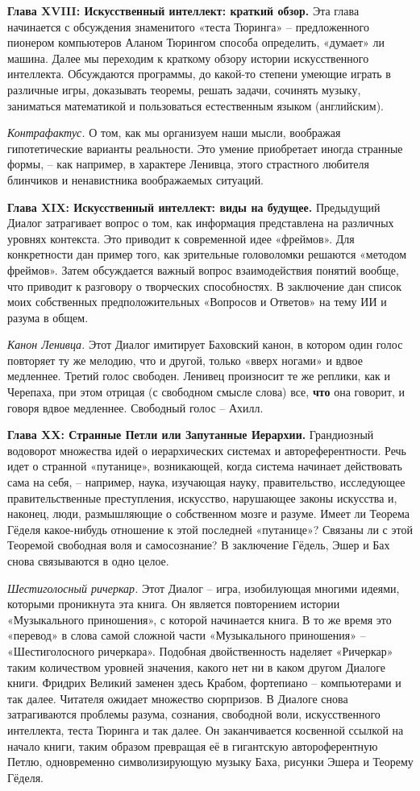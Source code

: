 \documentclass[../main.tex]{subfiles}
\begin{document}
\textbf{Глава XVIII: Искусственный интеллект: краткий обзор.}
Эта глава начинается с обсуждения знаменитого «теста Тюринга» \--- предложенного пионером компьютеров Аланом Тюрингом способа определить, «думает» ли машина. Далее мы переходим к краткому обзору истории искусственного интеллекта. Обсуждаются программы, до какой-то степени умеющие играть в различные игры, доказывать теоремы, решать задачи, сочинять музыку, заниматься математикой и пользоваться естественным языком (английским).

\emph{Контрафактус.}
О том, как мы организуем наши мысли, воображая гипотетические варианты реальности. Это умение приобретает иногда странные формы, \--- как например, в характере Ленивца, этого страстного любителя блинчиков и ненавистника воображаемых ситуаций.

\textbf{Глава XIX: Искусственный интеллект: виды на будущее.}
Предыдущий Диалог затрагивает вопрос о том, как информация представлена на различных уровнях контекста. Это приводит к современной идее «фреймов». Для конкретности дан пример того, как зрительные головоломки решаются «методом фреймов». Затем обсуждается важный вопрос взаимодействия понятий вообще, что приводит к разговору о творческих способностях. В заключение дан список моих собственных предположительных «Вопросов и Ответов» на тему ИИ и разума в общем.

\emph{Канон Ленивца.}
Этот Диалог имитирует Баховский канон, в котором один голос повторяет ту же мелодию, что и другой, только «вверх ногами» и вдвое медленнее. Третий голос свободен. Ленивец произносит те же реплики, как и Черепаха, при этом отрицая (с свободном смысле слова) все, \textbf{что} она говорит, и говоря вдвое медленнее. Свободный голос \--- Ахилл.

\textbf{Глава XX: Странные Петли или Запутанные Иерархии.}
Грандиозный водоворот множества идей о иерархических системах и автореферентности. Речь идет о странной «путанице», возникающей, когда система начинает действовать сама на себя, \--- например, наука, изучающая науку, правительство, исследующее правительственные преступления, искусство, нарушающее законы искусства и, наконец, люди, размышляющие о собственном мозге и разуме. Имеет ли Теорема Гёделя какое-нибудь отношение к этой последней «путанице»? Связаны ли с этой Теоремой свободная воля и самосознание? В заключение Гёдель, Эшер и Бах снова связываются в одно целое.

\emph{Шестиголосный ричеркар.}
Этот Диалог \--- игра, изобилующая многими идеями, которыми проникнута эта книга. Он является повторением истории «Музыкального приношения», с которой начинается книга. В то же время это «перевод» в слова самой сложной части «Музыкального приношения» \--- «Шестиголосного ричеркара». Подобная двойственность наделяет «Ричеркар» таким количеством уровней значения, какого нет ни в каком другом Диалоге книги. Фридрих Великий заменен здесь Крабом, фортепиано \--- компьютерами и так далее. Читателя ожидает множество сюрпризов. В Диалоге снова затрагиваются проблемы разума, сознания, свободной воли, искусственного интеллекта, теста Тюринга и так далее. Он заканчивается косвенной ссылкой на начало книги, таким образом превращая её в гигантскую автороферентную Петлю, одновременно символизирующую музыку Баха, рисунки Эшера и Теорему Гёделя.
\end{document}
